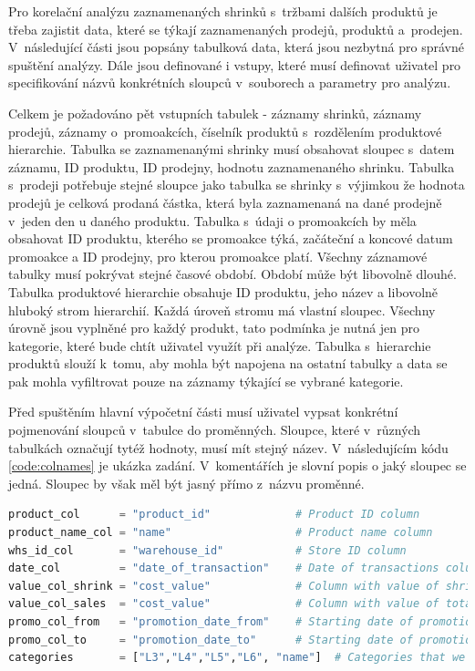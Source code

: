 Pro korelační analýzu zaznamenaných shrinků s~tržbami dalších produktů je třeba zajistit data, které se týkají zaznamenaných prodejů, produktů a~prodejen. V~následující části jsou popsány tabulková data, která jsou nezbytná pro správné spuštění analýzy. Dále jsou definované i vstupy, které musí definovat uživatel pro specifikování názvů konkrétních sloupců v~souborech a parametry pro analýzu.

Celkem je požadováno pět vstupních tabulek - záznamy shrinků, záznamy prodejů, záznamy o~promoakcích, číselník produktů s~rozdělením produktové hierarchie. %
Tabulka se zaznamenanými shrinky musí obsahovat sloupec s~datem záznamu, ID produktu, ID prodejny, hodnotu zaznamenaného shrinku. Tabulka s~prodeji potřebuje stejné sloupce jako tabulka se shrinky s~výjimkou že hodnota prodejů je celková prodaná částka, která byla zaznamenaná na dané prodejně v~jeden den u daného produktu. Tabulka s~údaji o promoakcích by měla obsahovat ID produktu, kterého se promoakce týká, začáteční a koncové datum promoakce a ID prodejny, pro kterou promoakce platí.
Všechny záznamové tabulky musí pokrývat stejné časové období. Období může být libovolně dlouhé.
Tabulka produktové hierarchie obsahuje ID produktu, jeho název a libovolně hluboký strom hierarchií. Každá úroveň stromu má vlastní sloupec. Všechny úrovně jsou vyplněné pro každý produkt, tato podmínka je nutná jen pro kategorie, které bude chtít uživatel využít při analýze. 
Tabulka s~hierarchie produktů slouží k~tomu, aby mohla být napojena na ostatní tabulky a data se pak mohla vyfiltrovat pouze na záznamy týkající se vybrané kategorie.

Před spuštěním hlavní výpočetní části musí uživatel vypsat konkrétní pojmenování sloupců v~tabulce do proměnných. Sloupce, které v~různých tabulkách označují tytéž hodnoty, musí mít stejný název. V~následujícím kódu \ref*{code:colnames} je ukázka zadání. V~komentářích je slovní popis o jaký sloupec se jedná. Sloupec by však měl být jasný přímo z~názvu proměnné.

\begin{lstlisting}[language=Python, style=mystyle, label={code:colnames}, caption={Definice konkrétních názvů sloupců.}]
product_col      = "product_id"             # Product ID column
product_name_col = "name"                   # Product name column
whs_id_col       = "warehouse_id"           # Store ID column
date_col         = "date_of_transaction"    # Date of transactions column - for sales and shrinks tables
value_col_shrink = "cost_value"             # Column with value of shrinks (shrink table)
value_col_sales  = "cost_value"             # Column with value of total sales (sales table)
promo_col_from   = "promotion_date_from"    # Starting date of promotion (promotion table)
promo_col_to     = "promotion_date_to"      # Starting date of promotion (promotion table)
categories       = ["L3","L4","L5","L6", "name"]  # Categories that we want to map to product ID (product hierarchy) 
\end{lstlisting}


